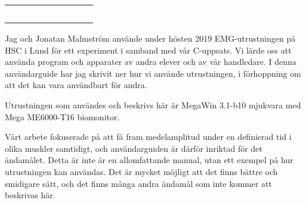\documentclass[10pt,a4paper]{article}
\newcommand{\pagetitle}[2] {
	\begin{tabularx}{\linewidth}{>{\columncolor{darkpurple}}c >{\columncolor{lightpurple!35}}X}
		\LARGE \textcolor{white}{{#1}} & \LARGE {#2} \\[3pt]
	\end{tabularx}
}
\begin{document}
\restoregeometry
\newpage


\pagetitle{Om denna guide}{}\par
\vspace{1em}
Jag och Jonatan Malmström använde under hösten 2019 EMG-utrustningen på HSC i Lund för ett experiment i samband med vår C-uppsats. Vi lärde oss att använda program och apparater av andra elever och av vår handledare. I denna användarguide har jag skrivit ner hur vi använde utrustningen, i förhoppning om att det kan vara användbart för andra.

Utrustningen som användes och beskrivs här är MegaWin 3.1-b10 mjukvara med Mega ME6000-T16 biomonitor.  

Vårt arbete fokuserade på att få fram medelamplitud under en definierad tid i olika muskler samtidigt, och användarguiden är därför inriktad för det ändamålet. Detta är inte är en allomfattande manual, utan ett exempel på hur utrustningen kan användas. Det är mycket möjligt att det finns bättre och smidigare sätt, och det finns många andra ändamål som inte kommer att beskrivas här.
\end{document}
